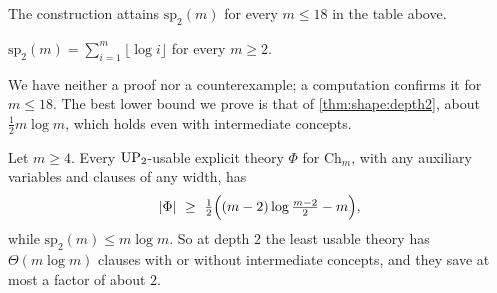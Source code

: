 The construction attains $\mathrm{sp}_2(m)$ for every $m\le18$ in the table above.

\begin{conjecture}\label{conj:shape:depth2}
$\mathrm{sp}_2(m)=\sum_{i=1}^m\lfloor\log i\rfloor$ for every $m\ge2$.
\end{conjecture}

We have neither a proof nor a counterexample; a computation confirms it for $m\le18$. The best lower bound we prove is that of \cref{thm:shape:depth2}, about $\frac12m\log m$, which holds even with intermediate concepts.

\begin{theorem}\label{thm:shape:depth2}
Let $m\ge4$. Every $\mathrm{UP}_2$-usable explicit theory $\Phi$ for $\mathrm{Ch}_m$, with any auxiliary variables and clauses of any width, has
\[
\lvert\Phi\rvert\ \ge\ \tfrac12\Bigl((m-2)\log\tfrac{m-2}{2}-m\Bigr),
\]
while $\mathrm{sp}_2(m)\le m\log m$. So at depth $2$ the least usable theory has $\Theta(m\log m)$ clauses with or without intermediate concepts, and they save at most a factor of about $2$.
\end{theorem}

